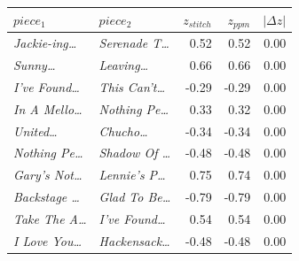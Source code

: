 \begin{tabular}{llrrr}
\toprule
$piece_1$ & $piece_2$ & $z_{stitch}$ & $z_{ppm}$ & $|\Delta z|$ \\
\midrule
\textit{Jackie-ing\dots} & \textit{Serenade T\dots} & 0.52 & 0.52 & 0.00 \\
\textit{Sunny\dots} & \textit{Leaving\dots} & 0.66 & 0.66 & 0.00 \\
\textit{I've Found\dots} & \textit{This Can't\dots} & -0.29 & -0.29 & 0.00 \\
\textit{In A Mello\dots} & \textit{Nothing Pe\dots} & 0.33 & 0.32 & 0.00 \\
\textit{United\dots} & \textit{Chucho\dots} & -0.34 & -0.34 & 0.00 \\
\textit{Nothing Pe\dots} & \textit{Shadow Of \dots} & -0.48 & -0.48 & 0.00 \\
\textit{Gary's Not\dots} & \textit{Lennie's P\dots} & 0.75 & 0.74 & 0.00 \\
\textit{Backstage \dots} & \textit{Glad To Be\dots} & -0.79 & -0.79 & 0.00 \\
\textit{Take The A\dots} & \textit{I've Found\dots} & 0.54 & 0.54 & 0.00 \\
\textit{I Love You\dots} & \textit{Hackensack\dots} & -0.48 & -0.48 & 0.00 \\
\bottomrule
\end{tabular}
